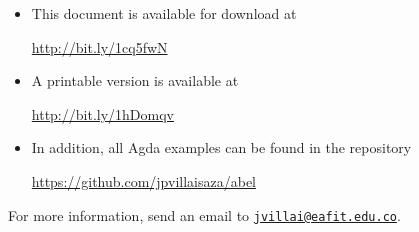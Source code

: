 \begin{itemize}
\item
  This document is available for download at
  \begin{center}
    \url{http://bit.ly/1cq5fwN}
  \end{center}

\item
  A printable version is available at
  \begin{center}
    \url{http://bit.ly/1hDomqv}
  \end{center}

\item
  In addition, all Agda examples can be found in the repository
  \begin{center}
    \url{https://github.com/jpvillaisaza/abel}
  \end{center}

\end{itemize}
For more information, send an email to
\href{mailto:jvillai@eafit.edu.co}{\nolinkurl{jvillai@eafit.edu.co}}.

\nocite{*}

\clearemptydoublepage
